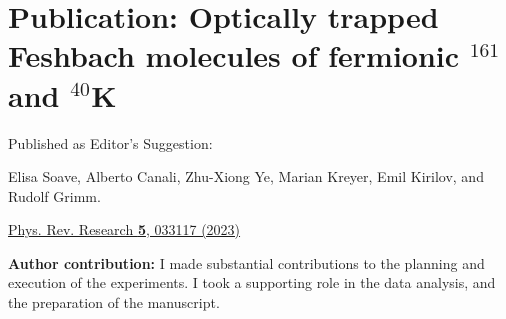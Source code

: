\chapter{Publication: Optically trapped Feshbach molecules of fermionic $^{161}$\Dy\, and $^{40}$K}
\label{Chpt:MolTrap}

\begin{flushleft}
	\noindent
	{\Large Published as Editor's Suggestion:\linebreak}
	
	{\Large Elisa Soave, Alberto Canali, Zhu-Xiong Ye, Marian Kreyer, Emil Kirilov, and Rudolf Grimm.\linebreak}
	
	{\Large\href{https://doi.org/10.1103/PhysRevResearch.5.033117}{Phys. Rev. Research  \textbf{5}, 033117 (2023)}\linebreak}
	
	
	\vfill
	
	\noindent
	{\large \textbf{Author contribution:}}
		I made substantial contributions to the planning and execution of 
		the experiments. I took a supporting role in the data analysis, and the preparation of the manuscript.\linebreak
	\noindent
	
	
\end{flushleft}


